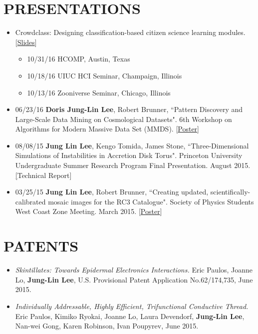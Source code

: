 \documentclass{res}
\begin{document}
\begin{resume}
\section{PRESENTATIONS}
\begin{itemize}
\item Crowdclass: Designing classification-based citizen science learning modules. [\href{http://dorisjunglinlee.com/files/crowdclass_slides.pdf}{Slides}]
	\begin{itemize}[label={$\circ$}]
	\item 10/31/16 HCOMP, Austin, Texas
	\item 10/18/16 UIUC HCI Seminar, Champaign, Illinois
	\item 10/13/16 Zooniverse Seminar, Chicago, Illinois
	\end{itemize}
\item 06/23/16 \textbf{Doris Jung-Lin Lee}, Robert Brunner, ``Pattern Discovery and Large-Scale Data Mining on Cosmological Datasets".  6th Workshop on Algorithms for Modern Massive Data Set (MMDS).  [\href{http://dorisjunglinlee.com/files/MMDS_poster.pdf}{Poster}]
\item 08/08/15 \textbf{Jung Lin Lee}, Kengo Tomida, James Stone, ``Three-Dimensional Simulations of Instabilities in Accretion Disk Torus". Princeton University Undergraduate Summer Research Program Final Presentation. August 2015. \href{http ://dorisjunglinlee.com/files/PrincetonUSRPreport.pdf}[{Technical Report}]
\item 03/25/15 \textbf{Jung Lin Lee}, Robert Brunner, ``Creating updated, scientifically-calibrated mosaic images for the RC3 Catalogue". Society of Physics Students West Coast Zone Meeting. March 2015. [\href{http://dorisjunglinlee.com/files/rc3_poster_sps_zone_meeting.pdf}{Poster}]
\end{itemize}
\section{PATENTS}
\begin{itemize}
\item \textit{Skintillates: Towards Epidermal Electronics Interactions.} Eric Paulos, Joanne Lo, \textbf{Jung-Lin Lee}, U.S. Provisional Patent Application No.62/174,735, June 2015.
\item \textit{Individually Addressable, Highly Efficient, Trifunctional Conductive Thread.} Eric Paulos, Kimiko Ryokai, Joanne Lo, Laura Devendorf, \textbf{Jung-Lin Lee}, Nan-wei Gong, Karen Robinson, Ivan Poupyrev, June 2015.
\end{itemize}

\end{resume}
\end{document}

